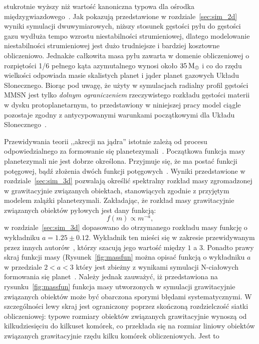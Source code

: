 stukrotnie wyższy niż wartość kanoniczna typowa dla ośrodka
międzygwiazdowego~\cite{FS03}. Jak pokazują przedstawione w rozdziale~\ref{sec:sim_2d}
wyniki symulacji dwuwymiarowych, niższy stosunek gęstości pyłu do gęstości gazu
wydłuża tempo wzrostu niestabilności strumieniowej, dlatego modelowanie
niestabilności strumieniowej jest  dużo trudniejsze i bardziej kosztowne
obliczeniowo.  Jednakże całkowita masa pyłu zawarta w domenie obliczeniowej o
rozpiętości 1/6 pełnego kąta azymutalnego wynosi około $35\hbox{$\mathrm{\thinspace M_{\oplus}}$}$ i co do rzędu
wielkości odpowiada masie skalistych planet i jąder planet gazowych Układu
Słonecznego. Biorąc pod uwagę, że użyty w symulacjach radialny profil gęstości
MMSN jest tylko \emph{dolnym ograniczeniem} rzeczywistego rozkładu gęstości
materii w dysku protoplanetarnym, to przedstawiony w niniejszej pracy model
ciągle pozostaje zgodny z antycypowanymi warunkami początkowymi dla Układu
Słonecznego~\cite{D07}.
\par Przewidywania teorii ,,akrecji na jądra'' istotnie zależą od procesu
odpowiedzialnego za formowanie się planetezymali~\cite{HBP13}. Początkowa
funkcja masy planetezymali nie jest dobrze określona. Przyjmuje się, że ma
postać funkcji potęgowej, bądź złożenia dwóch funkcji potęgowych~\cite{R03}.
Wyniki przedstawione w rozdziale~\ref{sec:sim_3d} pozwalają określić spektralny
rozkład masy zgromadzonej w grawitacyjnie związanych obiektach, stanowiących
zgodnie z przyjętym modelem zalążki planetezymali.  Zakładając, że rozkład masy
grawitacyjnie związanych obiektów pyłowych jest dany funkcją:
%
\begin{equation}
   f(m) \propto m^{-a},
\end{equation}
%
w rozdziale~\ref{sec:sim_3d} dopasowano do otrzymanego rozkładu masy funkcję o
wykładniku $a = 1.25\pm0.12$. Wykładnik ten mieści się w zakresie przewidywanym
przez innych
autorów~\cite{R03}, którzy szacują jego wartość między $1$ a $3$. Ponadto prawy
skraj funkcji masy (Rysunek~\ref{fig:massfun} można opisać funkcją o wykładniku
$a$ w przedziale $2 < a < 3$ który jest zbieżny z wynikami symulacji N-ciałowych
formowania się planet~\cite{MFFK98}.  Należy jednak zauważyć, iż przedstawiona
na rysunku~\ref{fig:massfun} funkcja masy utworzonych w symulacji grawitacyjnie
związanych obiektów może być obarczona sporymi błędami systematycznymi.
W szczególności lewy skraj jest ograniczony poprzez skończoną rozdzielczość
siatki obliczeniowej: typowe rozmiary obiektów związanych grawitacyjnie wynoszą
od kilkudziesięciu do kilkuset komórek, co przekłada się na rozmiar liniowy
obiektów związanych grawitacyjnie rzędu kilku komórek obliczeniowych. Jest to
